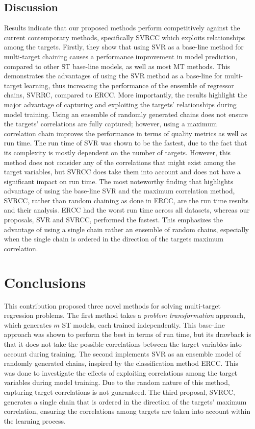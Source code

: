 \documentclass[reqno]{vcuthesis}
\numberwithin{equation}{chapter}
\begin{document}
\subsection{Discussion}\label{sec:discussion}
Results indicate that our proposed methods perform competitively against the current contemporary methods, specifically SVRCC which exploits relationships among the targets. Firstly, they show that using SVR as a base-line method for multi-target chaining causes a performance improvement in model prediction, compared to other ST base-line models, as well as most MT methods. This demonstrates the advantages of using the SVR method as a base-line for multi-target learning, thus increasing the performance of the ensemble of regressor chains, SVRRC, compared to ERCC. More importantly, the results highlight the major advantage of capturing and exploiting the targets' relationships during model training. Using an ensemble of randomly generated chains does not ensure the targets' correlations are fully captured; however, using a maximum correlation chain improves the performance in terms of quality metrics as well as run time. The run time of SVR was shown to be the fastest, due to the fact that its complexity is mostly dependent on the number of targets. However, this method does not consider any of the correlations that might exist among the target variables, but SVRCC does take them into account and does not have a significant impact on run time. The most noteworthy finding that highlights advantage of using the base-line SVR and the maximum correlation method, SVRCC, rather than random chaining as done in ERCC, are the run time results and their analysis. ERCC had the worst run time across all datasets, whereas our proposals, SVR and SVRCC, performed the fastest. This emphasizes the advantage of using a single chain rather an ensemble of random chains, especially when the single chain is ordered in the direction of the targets maximum correlation.

\section{Conclusions}\label{sec:MTRconclusions}
This contribution proposed three novel methods for solving multi-target regression problems. The first method takes a \textit{problem transformation} approach, which generates $m$ ST models, each trained independently. This base-line approach was shown to perform the best in terms of run time, but its drawback  is that it does not take the possible correlations between the target variables into account during training. The second implements SVR as an ensemble model of randomly generated chains, inspired by the classification method ERCC. This was done to investigate the effects of exploiting correlations among the target variables during model training. Due to the random nature of this method, capturing target correlations is not guaranteed. The third proposal, SVRCC, generates a single chain that is ordered in the direction of the targets' maximum correlation, ensuring the correlations among targets are taken into account within the learning process.
\end{document}
